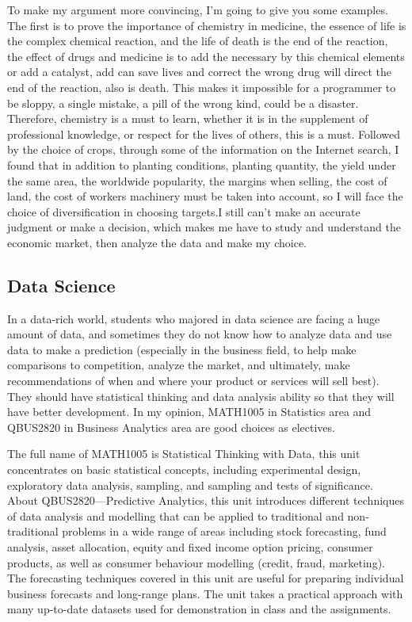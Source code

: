 \documentclass[12pt]{article}
\begin{document}
To make my argument more convincing, I'm going to give you some examples. The first is to prove the importance of chemistry in medicine, the essence of life is the complex chemical reaction, and the life of death is the end of the reaction, the effect of drugs and medicine is to add the necessary by this chemical elements or add a catalyst, add can save lives and correct the wrong drug will direct the end of the reaction, also is death. This makes it impossible for a programmer to be sloppy, a single mistake, a pill of the wrong kind, could be a disaster. Therefore, chemistry is a must to learn, whether it is in the supplement of professional knowledge, or respect for the lives of others, this is a must. Followed by the choice of crops, through some of the information on the Internet search, I found that in addition to planting conditions, planting quantity, the yield under the same area, the worldwide popularity, the margins when selling, the cost of land, the cost of workers machinery must be taken into account, so I will face the choice of diversification in choosing targets.I still can't make an accurate judgment or make a decision, which makes me have to study and understand the economic market, then analyze the data and make my choice.

\newpage
\subsection{Data Science}
In a data-rich world, students who majored in data science are facing a huge amount of data, and sometimes they do not know how to analyze data and use data to make a prediction (especially in the business field, to help make comparisons to competition, analyze the market, and ultimately, make recommendations of when and where your product or services will sell best). They should have statistical thinking and data analysis ability so that they will have better development. In my opinion, MATH1005 in Statistics area and QBUS2820 in Business Analytics area are good choices as electives.

The full name of MATH1005 is Statistical Thinking with Data, this unit concentrates on basic statistical concepts, including experimental design, exploratory data analysis, sampling, and sampling and tests of significance. About QBUS2820—Predictive Analytics, this unit introduces different techniques of data analysis and modelling that can be applied to traditional and non-traditional problems in a wide range of areas including stock forecasting, fund analysis, asset allocation, equity and fixed income option pricing, consumer products, as well as consumer behaviour modelling (credit, fraud, marketing). The forecasting techniques covered in this unit are useful for preparing individual business forecasts and long-range plans. The unit takes a practical approach with many up-to-date datasets used for demonstration in class and the assignments.
\end{document}
